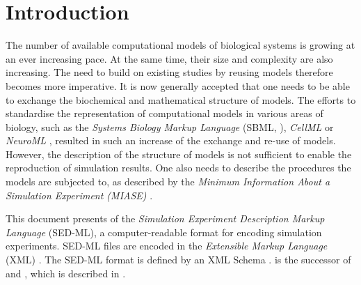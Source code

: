 \chapter{Introduction}

The number of available computational models of biological systems is growing at an ever increasing pace. 
At the same time, their size and complexity are also increasing. The need to build on existing studies by reusing models therefore becomes more imperative. 
It is now generally accepted that one needs to be able to exchange the biochemical and mathematical structure of models. 
The efforts to standardise the representation of computational models in various areas of biology, such as the \emph{Systems Biology Markup Language} (SBML, \citep{Hucka:2003}), \emph{CellML} \citep{cuellar:2003} or \emph{NeuroML} \citep{Goddard:2001}, resulted in such an increase of the exchange and re-use of models. 
However, the description of the structure of models is not sufficient to enable the reproduction of simulation results.  
One also needs to describe the procedures the models are subjected to, as described by the \emph{Minimum Information About a Simulation Experiment (MIASE)} \citep{Waltemath:2011}. 

This document presents  \currentLV of the \emph{Simulation Experiment Description Markup Language} (SED-ML), a computer-readable format for encoding simulation experiments. 
SED-ML files are encoded in the \emph{Extensible Markup Language} (XML) \citep{Bray:2006}. The SED-ML format is defined by an XML Schema \citep{Fallside:2001}. 
\currentLV is the successor of \previousLV and \LoneVone, which is described in \citep{WAB+11}.




